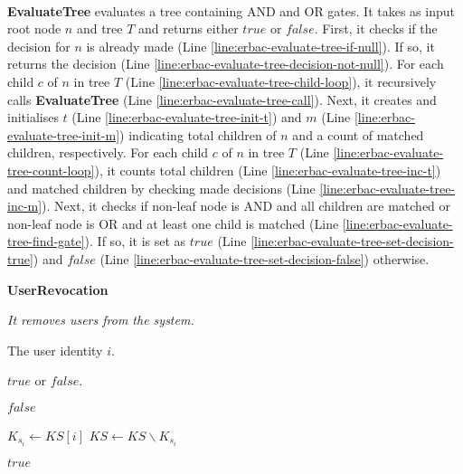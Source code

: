 \documentclass[epsfig,a4paper,11pt,titlepage]{book}
\numberwithin{algorithm}{chapter}
\newcommand{\algofontsize}{\fontsize{11}{12}\selectfont}
\begin{document}
\noindent \\
\noindent \textbf{EvaluateTree} evaluates a tree containing AND and OR gates. It takes as input root node $n$ and tree $T$ and returns either $\mathit{true}$ or $\mathit{false}$. First, it checks if the decision for $n$ is already made (Line \ref{line:erbac-evaluate-tree-if-null}). If so, it returns the decision (Line \ref{line:erbac-evaluate-tree-decision-not-null}). For each child $c$ of $n$ in tree $T$ (Line \ref{line:erbac-evaluate-tree-child-loop}), it recursively calls \textbf{EvaluateTree} (Line \ref{line:erbac-evaluate-tree-call}). Next, it creates and initialises $t$ (Line \ref{line:erbac-evaluate-tree-init-t}) and $m$ (Line \ref{line:erbac-evaluate-tree-init-m}) indicating total children of $n$ and a count of matched children, respectively. For each child $c$ of $n$ in tree $T$ (Line \ref{line:erbac-evaluate-tree-count-loop}), it counts total children (Line \ref{line:erbac-evaluate-tree-inc-t}) and matched children by checking made decisions (Line \ref{line:erbac-evaluate-tree-inc-m}). Next, it checks if non-leaf node is AND and all children are matched or non-leaf node is OR and at least one child is matched (Line \ref{line:erbac-evaluate-tree-find-gate}). If so, it is set as $\mathit{true}$ (Line \ref{line:erbac-evaluate-tree-set-decision-true}) and $\mathit{false}$ (Line \ref{line:erbac-evaluate-tree-set-decision-false}) otherwise.




\begin{algorithm} [htp]
{\algofontsize
\caption{\textbf{UserRevocation}}

\label{algo:egrant-user-revocation}

\begin{algorithmic}[1]

\INPUT \emph{It removes users from the system.}

\Require The user identity $i$.

\Ensure $\mathit{true}$ or $\mathit{false}$.

\medskip

 \label{line:egrant-user-presence}

	\Return $\mathit{false}$ \label{line:egrant-no-user-present}

\EndIf

\State $K_{s_i} \leftarrow KS[i]$ \label{line:egrant-get-user-key}
\State $KS \leftarrow KS \backslash K_{s_i}$ \label{line:egrant-remove-user-key}

\Return $\mathit{true}$ \label{line:egrant-user-removed-successfully}

\end{algorithmic}
}
\end{algorithm}
\end{document}
